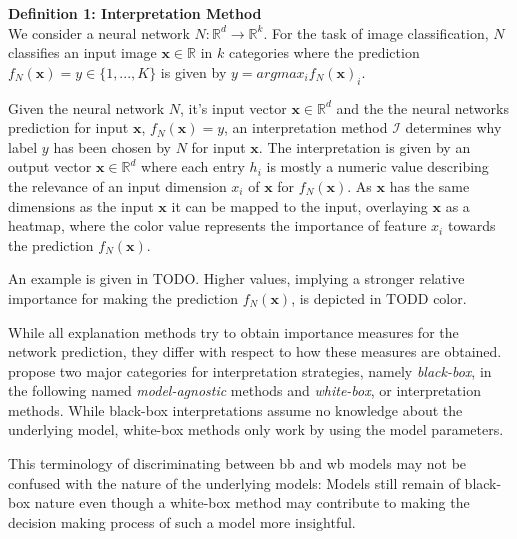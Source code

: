 \textbf{Definition 1: Interpretation Method}\\
We consider a neural network $N: \mathbb{R}^d \to \mathbb{R}^k$. For the task of image classification, $N$ classifies an input image $\mathbf{x}\in \mathbb{R}$ in $k$ categories where the prediction $f_N(\mathbf{x})=y \in \{1, ..., K\}$ is given by $y = arg max_i f_N(\mathbf{x})_i$.

Given the neural network $N$, it's input vector $\mathbf{x} \in \mathbb{R}^d$ and the the neural networks prediction for input $\mathbf{x}$, $f_N(\mathbf{x})=y$, an interpretation method $\mathcal{I}$ determines why label $y$ has been chosen by $N$ for input $\mathbf{x}$. 
The interpretation is given by an output vector $\mathbf{x} \in \mathbb{R}^d$ where each entry $h_i$ is mostly a numeric value describing the relevance of an input dimension $x_i$ of $\mathbf{x}$ for $f_N(\mathbf{x})$. 
As $\mathbf{x}$ has the same dimensions as the input $\mathbf{x}$ it can be mapped to the input, overlaying $\mathbf{x}$ as a heatmap, where the color value represents the importance of feature $x_i$ towards the prediction $f_N(\mathbf{x})$.

An example is given in TODO. Higher values, implying a stronger relative importance for making the prediction $f_N(\mathbf{x})$, is depicted in TODD color. 



While all explanation methods try to obtain importance measures for the network prediction, they differ with respect to how these measures are obtained. 
\cite{evaluating_explanations_security} propose two major categories for interpretation strategies, namely \textit{black-box}, in the following named \textit{model-agnostic} methods and \textit{white-box}, or \textit{} interpretation methods. 
While black-box interpretations assume no knowledge about the underlying model, white-box methods only work by using the model parameters. 

This terminology of discriminating between bb and wb models may not be confused with the nature of the underlying models: Models still remain of black-box nature even though a white-box method may contribute to making the decision making process of such a model more insightful. %


